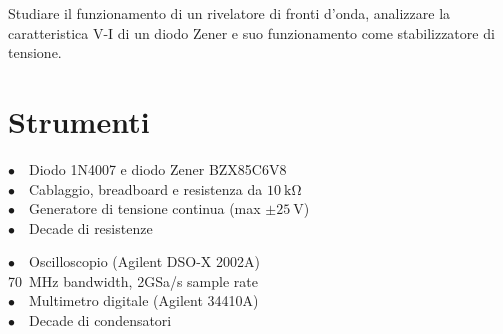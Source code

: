 Studiare il funzionamento di un rivelatore di fronti d'onda, analizzare la caratteristica V-I di un diodo Zener e suo funzionamento come stabilizzatore di tensione.

\section{Strumenti}
%
\phantom{porcodio!}
\noindent
\begin{minipage}{.5\linewidth}
$\bullet \quad$Diodo 1N4007 e diodo Zener BZX85C6V8\\
$\bullet \quad$Cablaggio, breadboard e resistenza da $\SI{10}{\kilo\ohm}$\\
$\bullet \quad$Generatore di tensione continua (max $\pm \SI{25}{\volt}$)\\
$\bullet \quad$Decade di resistenze
\end{minipage}%
\begin{minipage}{.5\linewidth}
$\bullet \quad$Oscilloscopio (Agilent DSO-X 2002A)\\
\phantom{xxxx}\SI{70}{\mega\hertz} bandwidth, 2GSa/s sample rate\\
$\bullet \quad$Multimetro digitale (Agilent 34410A)\\
$\bullet \quad$Decade di condensatori
\end{minipage}